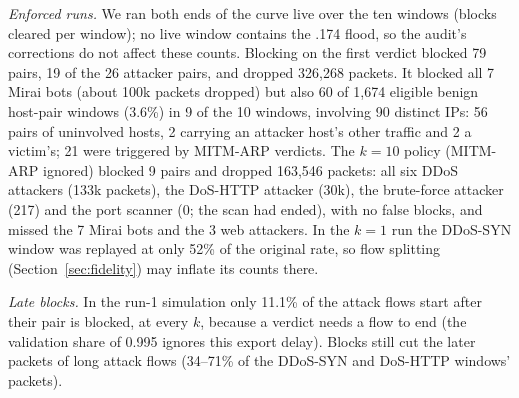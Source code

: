 \emph{Enforced runs.} We ran both ends of the curve live over the ten windows (blocks cleared per window); no live window contains the .174 flood, so the audit's corrections do not affect these counts. Blocking on the first verdict blocked 79 pairs, 19 of the 26 attacker pairs, and dropped 326,268 packets. It blocked all 7 Mirai bots (about 100k packets dropped) but also 60 of 1,674 eligible benign host-pair windows (3.6\%) in 9 of the 10 windows, involving 90 distinct IPs: 56 pairs of uninvolved hosts, 2 carrying an attacker host's other traffic and 2 a victim's; 21 were triggered by MITM-ARP verdicts. The $k=10$ policy (MITM-ARP ignored) blocked 9 pairs and dropped 163,546 packets: all six DDoS attackers (133k packets), the DoS-HTTP attacker (30k), the brute-force attacker (217) and the port scanner (0; the scan had ended), with no false blocks, and missed the 7 Mirai bots and the 3 web attackers. In the $k=1$ run the DDoS-SYN window was replayed at only 52\% of the original rate, so flow splitting (Section~\ref{sec:fidelity}) may inflate its counts there.

\emph{Late blocks.} In the run-1 simulation only 11.1\% of the attack flows start after their pair is blocked, at every $k$, because a verdict needs a flow to end (the validation share of 0.995 ignores this export delay). Blocks still cut the later packets of long attack flows (34--71\% of the DDoS-SYN and DoS-HTTP windows' packets).
